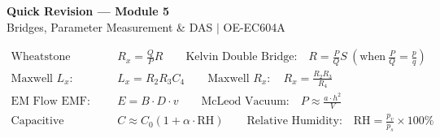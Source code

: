 \documentclass[12pt,a4paper]{article}
\begin{document}
\newpage
\begin{center}
  {\large\bfseries\color{myred} Quick Revision --- Module 5}\\[3pt]
  {\small\color{mydark} Bridges, Parameter Measurement \& DAS $|$ OE-EC604A}
\end{center}
\noindent{\color{myred}\rule{\linewidth}{1.2pt}}
\vspace{4pt}

\begin{tcolorbox}[formulabox, title={\textbf{Key Module 5 Formulas}}]
\begin{align*}
  \text{Wheatstone Bridge:} \quad & R_x = \frac{Q}{P} R \qquad \text{Kelvin Double Bridge:} \quad R = \frac{P}{Q} S \ \left(\text{when} \ \frac{P}{Q} = \frac{p}{q}\right) \\
  \text{Maxwell } L_x: \quad & L_x = R_2 R_3 C_4 \qquad \text{Maxwell } R_x: \quad R_x = \frac{R_2 R_3}{R_4} \\
  \text{EM Flow EMF:} \quad & E = B \cdot D \cdot v \qquad \text{McLeod Vacuum:} \quad P \approx \frac{a \cdot h^2}{V} \\
  \text{Capacitive Humidity:} \quad & C \approx C_0 (1 + \alpha \cdot \text{RH}) \qquad \text{Relative Humidity:} \quad \text{RH} = \frac{p_v}{p_s} \times 100\%
\end{align*}
\end{tcolorbox}
\end{document}
